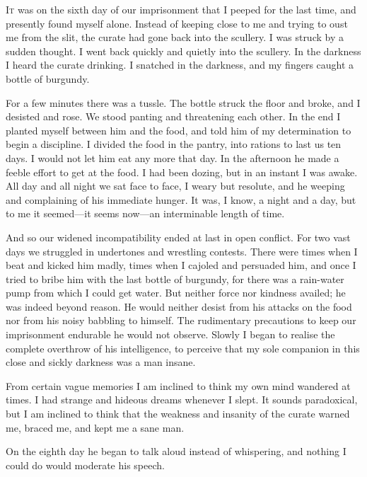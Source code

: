 

\lettrine[lines=4,findent=2pt]{I}{t} was on the sixth day of our imprisonment that I peeped for the last time, and presently found myself alone. Instead of keeping close to me and trying to oust me from the slit, the curate had gone back into the scullery. I was struck by a sudden thought. I went back quickly and quietly into the scullery. In the darkness I heard the curate drinking. I snatched in the darkness, and my fingers caught a bottle of burgundy.

For a few minutes there was a tussle. The bottle struck the floor and broke, and I desisted and rose. We stood panting and threatening each other. In the end I planted myself between him and the food, and told him of my determination to begin a discipline. I divided the food in the pantry, into rations to last us ten days. I would not let him eat any more that day. In the afternoon he made a feeble effort to get at the food. I had been dozing, but in an instant I was awake. All day and all night we sat face to face, I weary but resolute, and he weeping and complaining of his immediate hunger. It was, I know, a night and a day, but to me it seemed—it seems now—an interminable length of time.

And so our widened incompatibility ended at last in open conflict. For two vast days we struggled in undertones and wrestling contests. There were times when I beat and kicked him madly, times when I cajoled and persuaded him, and once I tried to bribe him with the last bottle of burgundy, for there was a rain-water pump from which I could get water. But neither force nor kindness availed; he was indeed beyond reason. He would neither desist from his attacks on the food nor from his noisy babbling to himself. The rudimentary precautions to keep our imprisonment endurable he would not observe. Slowly I began to realise the complete overthrow of his intelligence, to perceive that my sole companion in this close and sickly darkness was a man insane.

From certain vague memories I am inclined to think my own mind wandered at times. I had strange and hideous dreams whenever I slept. It sounds paradoxical, but I am inclined to think that the weakness and insanity of the curate warned me, braced me, and kept me a sane man.

On the eighth day he began to talk aloud instead of whispering, and nothing I could do would moderate his speech.

